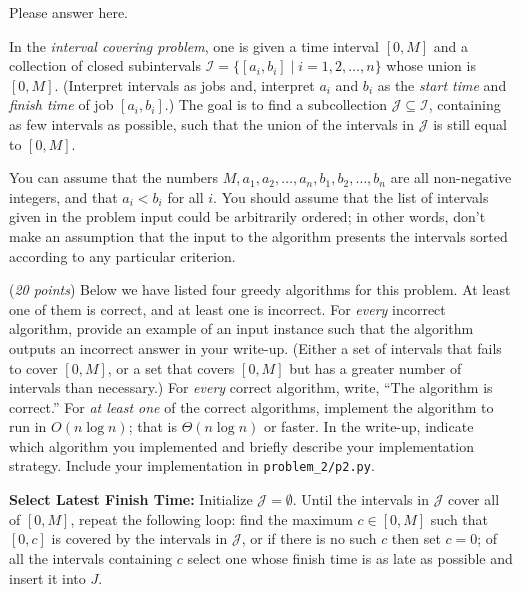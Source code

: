 \documentclass{hw}
\begin{document}
\begin{problem}
\begin{solution}
Please answer here.
\end{solution}

\end{problem}


\newpage

\begin{problem}
In the {\em interval covering problem},
one is given a time interval $[0,M]$
and a collection of closed subintervals
$\mathcal{I} = \{[a_i,b_i] \mid i=1,2,\ldots,n\}$
whose union is $[0,M]$. (Interpret intervals as jobs
and, interpret $a_i$ and $b_i$ as the {\em start time}
and {\em finish time} of job $[a_i,b_i]$.)
The goal is to find a subcollection
$\mathcal{J} \subseteq \mathcal{I}$, containing
as few intervals as possible, such that
the union of the intervals in $\mathcal{J}$
is still equal to $[0,M]$.

You can assume that the
numbers $M,a_1,a_2,\ldots,a_n,b_1,b_2,\ldots,b_n$
are all non-negative integers, and that
$a_i < b_i$ for all $i$. You should assume
that the list of intervals given in the
problem input could be arbitrarily ordered;
in other words, don't make an assumption that
the input to the algorithm presents the intervals
sorted according to any particular criterion.

(\textit{20 points}) Below we have listed four greedy algorithms for
this problem. At least one of them is correct,
and at least one is incorrect. For {\em every} incorrect
algorithm, provide an example of an input instance
such that the algorithm outputs an incorrect answer
in your write-up.
(Either a set of intervals that fails to cover $[0,M]$,
or a set that covers $[0,M]$ but has a greater number
of intervals than necessary.) For {\em every} correct
algorithm, write, ``The algorithm is correct.''
For {\em at least one} of the correct algorithms,
implement the algorithm to run in $O(n \log n)$; that is 
$\Theta(n \log n)$ or faster.
In the write-up, indicate which algorithm you implemented
and briefly describe your implementation strategy. Include your implementation in \texttt{problem\_2/p2.py}.

  \begin{subproblem}
    \textbf{Select Latest Finish Time:}
  Initialize $\mathcal{J}=\emptyset$.
  Until the intervals in $\mathcal{J}$ cover all of $[0,M]$,
  repeat the following loop: find the maximum $c \in [0,M]$
  such that $[0,c]$ is covered by the intervals in $\mathcal{J}$,
  or if there is no such $c$ then set $c=0$; of all the intervals
  containing $c$ select one whose finish time is as late as
  possible and insert it into $J$.
  \end{subproblem}


\end{problem}
\end{document}
